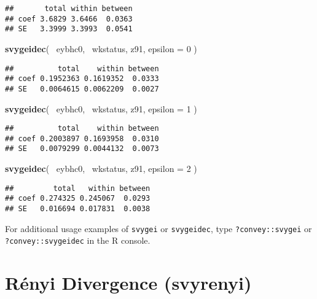 \documentclass[]{book}
\newenvironment{Shaded}{\begin{snugshade}}{\end{snugshade}}
\newcommand{\KeywordTok}[1]{\textcolor[rgb]{0.13,0.29,0.53}{\textbf{{#1}}}}
\newcommand{\DataTypeTok}[1]{\textcolor[rgb]{0.13,0.29,0.53}{{#1}}}
\newcommand{\DecValTok}[1]{\textcolor[rgb]{0.00,0.00,0.81}{{#1}}}
\newcommand{\NormalTok}[1]{{#1}}
\theoremstyle{definition}
\theoremstyle{definition}
\theoremstyle{remark}
\begin{document}
\begin{verbatim}
##       total within between
## coef 3.6829 3.6466  0.0363
## SE   3.3999 3.3993  0.0541
\end{verbatim}

\begin{Shaded}
\begin{Highlighting}[]
\KeywordTok{svygeidec}\NormalTok{( ~eybhc0, ~wkstatus, z91, }\DataTypeTok{epsilon =} \DecValTok{0} \NormalTok{)}
\end{Highlighting}
\end{Shaded}

\begin{verbatim}
##          total    within between
## coef 0.1952363 0.1619352  0.0333
## SE   0.0064615 0.0062209  0.0027
\end{verbatim}

\begin{Shaded}
\begin{Highlighting}[]
\KeywordTok{svygeidec}\NormalTok{( ~eybhc0, ~wkstatus, z91, }\DataTypeTok{epsilon =} \DecValTok{1} \NormalTok{)}
\end{Highlighting}
\end{Shaded}

\begin{verbatim}
##          total    within between
## coef 0.2003897 0.1693958  0.0310
## SE   0.0079299 0.0044132  0.0073
\end{verbatim}

\begin{Shaded}
\begin{Highlighting}[]
\KeywordTok{svygeidec}\NormalTok{( ~eybhc0, ~wkstatus, z91, }\DataTypeTok{epsilon =} \DecValTok{2} \NormalTok{)}
\end{Highlighting}
\end{Shaded}

\begin{verbatim}
##         total   within between
## coef 0.274325 0.245067  0.0293
## SE   0.016694 0.017831  0.0038
\end{verbatim}

For additional usage examples of \texttt{svygei} or \texttt{svygeidec},
type \texttt{?convey::svygei} or \texttt{?convey::svygeidec} in the R
console.

\section{Rényi Divergence (svyrenyi)}\label{renyi-divergence-svyrenyi}
\end{document}
